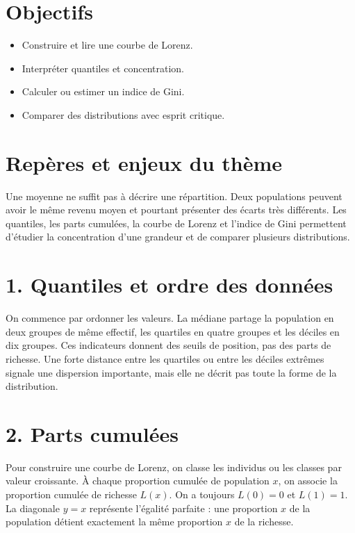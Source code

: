 \section{Objectifs}
\begin{itemize}
\item Construire et lire une courbe de Lorenz.
\item Interpréter quantiles et concentration.
\item Calculer ou estimer un indice de Gini.
\item Comparer des distributions avec esprit critique.
\end{itemize}
\section{Repères et enjeux du thème}
Une moyenne ne suffit pas à décrire une répartition. Deux populations peuvent avoir le même revenu moyen et pourtant présenter des écarts très différents. Les quantiles, les parts cumulées, la courbe de Lorenz et l'indice de Gini permettent d'étudier la concentration d'une grandeur et de comparer plusieurs distributions.
\section{1. Quantiles et ordre des données}
On commence par ordonner les valeurs. La médiane partage la population en deux groupes de même effectif, les quartiles en quatre groupes et les déciles en dix groupes. Ces indicateurs donnent des seuils de position, pas des parts de richesse.
Une forte distance entre les quartiles ou entre les déciles extrêmes signale une dispersion importante, mais elle ne décrit pas toute la forme de la distribution.
\section{2. Parts cumulées}
Pour construire une courbe de Lorenz, on classe les individus ou les classes par valeur croissante. À chaque proportion cumulée de population $x$, on associe la proportion cumulée de richesse $L(x)$. On a toujours $L(0)=0$ et $L(1)=1$.
La diagonale $y=x$ représente l'égalité parfaite : une proportion $x$ de la population détient exactement la même proportion $x$ de la richesse.
